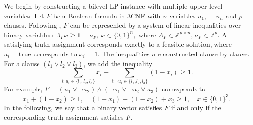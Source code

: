 \documentclass[runningheads,orivec]{llncs}
\newcommand{\MacroColor}[1]{#1}
\newcommand{\OneVector}{\mathbf{1}}
\newcommand{\SATBooleanFormula}{\MacroColor{F}}
\newcommand{\SATTruthAssignment}{\MacroColor{u}}
\newcommand{\SATReformulationBinaryVariable}{\MacroColor{x}}
\begin{document}
We begin by constructing a bilevel LP instance with multiple upper-level variables.
Let \( F \) be a Boolean formula in 3CNF with \( n \) variables \( \SATTruthAssignment{}_1, \ldots, \SATTruthAssignment{}_n \) and \( p \) clauses.
Following \cite{marcotte2005bilevel,pardalos1988checking}, \( F \) can be represented by a system of linear inequalities over binary variables:
$
A_{\SATBooleanFormula} \SATReformulationBinaryVariable{} \geq \OneVector - a_{\SATBooleanFormula}, \ \SATReformulationBinaryVariable{} \in \{0,1\}^n,
$
where \( A_{\SATBooleanFormula} \in \mathbb{Z}^{p \times n} \), \( a_{\SATBooleanFormula} \in \mathbb{Z}^p \).
A satisfying truth assignment corresponds exactly to a feasible solution, where $u_i = \text{true}$ corresponds to $x_i = 1$.
The inequalities are constructed clause by clause. For a clause $(l_1 \vee l_2 \vee l_3)$, we add the inequality 
\[
\sum_{i: u_i \in \{l_1, l_2, l_3\}} x_i
+
\sum_{i: \neg u_i \in \{l_1, l_2, l_3\}} (1 - x_i)
\ge 1.
\]
For example,
$
F = (\SATTruthAssignment{}_1 \vee \neg \SATTruthAssignment{}_2) \wedge (\neg \SATTruthAssignment{}_1 \vee \neg \SATTruthAssignment{}_2 \vee \SATTruthAssignment{}_3)
$
corresponds to
\[
\SATReformulationBinaryVariable{}_1 + (1 - \SATReformulationBinaryVariable{}_2) \geq 1, \quad (1 - \SATReformulationBinaryVariable{}_1) + (1 - \SATReformulationBinaryVariable{}_2) + \SATReformulationBinaryVariable{}_3 \geq 1, \quad \SATReformulationBinaryVariable{} \in \{0,1\}^3.
\]
In the following, we say that a binary vector satisfies \( \SATBooleanFormula \) if and only if the corresponding truth assignment satisfies \( \SATBooleanFormula \).
\end{document}
